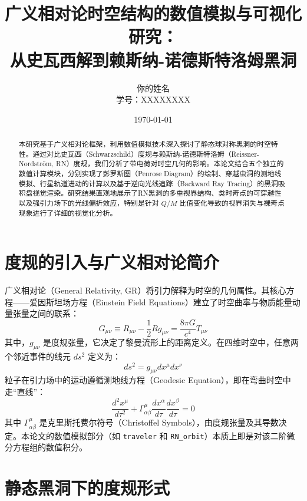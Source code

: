 \documentclass[a4paper,12pt]{article}
\title{\textbf{广义相对论时空结构的数值模拟与可视化研究：}\\从史瓦西解到赖斯纳-诺德斯特洛姆黑洞}
\author{你的姓名 \\ 学号：XXXXXXXX}
\date{\today}
\begin{document}
\maketitle

\begin{abstract}
本研究基于广义相对论框架，利用数值模拟技术深入探讨了静态球对称黑洞的时空特性。通过对比史瓦西（Schwarzschild）度规与赖斯纳-诺德斯特洛姆（Reissner-Nordström, RN）度规，我们分析了带电荷对时空几何的影响。本论文结合五个独立的数值计算模块，分别实现了彭罗斯图（Penrose Diagram）的绘制、穿越虫洞的测地线模拟、行星轨道进动的计算以及基于逆向光线追踪（Backward Ray Tracing）的黑洞吸积盘视觉渲染。研究结果直观地展示了RN黑洞的多重视界结构、类时奇点的可穿越性以及强引力场下的光线偏折效应，特别是针对 $Q/M$ 比值变化导致的视界消失与裸奇点现象进行了详细的视觉化分析。
\end{abstract}

\newpage

\section{度规的引入与广义相对论简介}

广义相对论（General Relativity, GR）将引力解释为时空的几何属性。其核心方程——爱因斯坦场方程（Einstein Field Equations）建立了时空曲率与物质能量动量张量之间的联系：
\begin{equation}
    G_{\mu\nu} \equiv R_{\mu\nu} - \frac{1}{2}R g_{\mu\nu} = \frac{8\pi G}{c^4} T_{\mu\nu}
\end{equation}
其中，$g_{\mu\nu}$ 是度规张量，它决定了黎曼流形上的距离定义。在四维时空中，任意两个邻近事件的线元 $ds^2$ 定义为：
\begin{equation}
    ds^2 = g_{\mu\nu} dx^\mu dx^\nu
\end{equation}
粒子在引力场中的运动遵循测地线方程（Geodesic Equation），即在弯曲时空中走“直线”：
\begin{equation}
    \frac{d^2 x^\mu}{d\tau^2} + \Gamma^\mu_{\alpha\beta} \frac{dx^\alpha}{d\tau} \frac{dx^\beta}{d\tau} = 0
\end{equation}
其中 $\Gamma^\mu_{\alpha\beta}$ 是克里斯托费尔符号（Christoffel Symbols），由度规张量及其导数决定。本论文的数值模拟部分（如 \texttt{traveler} 和 \texttt{RN\_orbit}）本质上即是对该二阶微分方程组的数值积分。

\section{静态黑洞下的度规形式}
\end{document}
